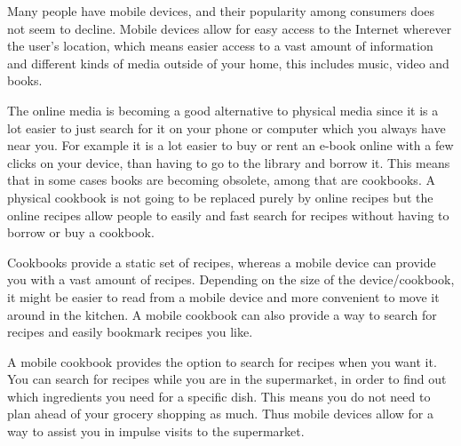Many people have mobile devices, and their popularity among consumers does not seem to decline\citep{mobilegrow}. Mobile devices allow for easy access to the Internet wherever the user's location, which means easier access to a vast amount of information and different kinds of media outside of your home, this includes music, video and books.

The online media is becoming a good alternative to physical media since it is a lot easier to just search for it on your phone or computer which you always have near you. 
For example it is a lot easier to buy or rent an e-book online with a few clicks on your device, than having to go to the library and borrow it. 
This means that in some cases books are becoming obsolete, among that are cookbooks. 
A physical cookbook is not going to be replaced purely by online recipes but the online recipes allow people to easily and fast search for recipes without having to borrow or buy a cookbook.

Cookbooks provide a static set of recipes, whereas a mobile device can provide you with a vast amount of recipes. Depending on the size of the device/cookbook, it might be easier to read from a mobile device and more convenient to move it around in the kitchen. A mobile cookbook can also provide a way to search for recipes and easily bookmark recipes you like.

A mobile cookbook provides the option to search for recipes when you want it. You can search for recipes while you are in the supermarket, in order to find out which ingredients you need for a specific dish. This means you do not need to plan ahead of your grocery shopping as much. Thus mobile devices allow for a way to assist you in impulse visits to the supermarket.
